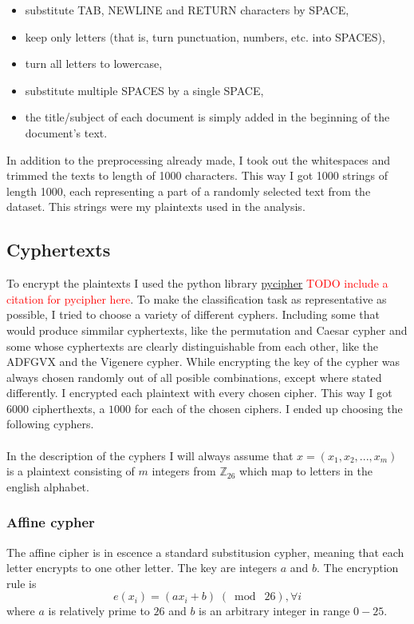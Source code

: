 \documentclass[a4paper]{article}
\begin{document}
\begin{itemize}	
	\setlength\itemsep{-0.2em}
    \item substitute TAB, NEWLINE and RETURN characters by SPACE,
    \item keep only letters (that is, turn punctuation, numbers, etc. into SPACES),
    \item turn all letters to lowercase,
    \item substitute multiple SPACES by a single SPACE,
    \item the title/subject of each document is simply added in the beginning of the document's text.
\end{itemize}


In addition to the preprocessing already made, I took out the whitespaces and trimmed the texts to length of 1000 characters. This way I got 1000 strings of length 1000, each representing a part of a randomly selected text from the dataset. This strings were my plaintexts used in the analysis.

\subsection*{Cyphertexts}
To encrypt the plaintexts I used the python library \href{https://github.com/jameslyons/pycipher}{pycipher} \textcolor{red}{TODO include a citation for pycipher here}. To make the classification task as representative as possible, I tried to choose a variety of different cyphers. Including some that would produce simmilar cyphertexts, like the permutation and Caesar cypher and some whose cyphertexts are clearly distinguishable from each other, like the ADFGVX and the Vigenere cypher. While encrypting the key of the cypher was always chosen randomly out of all posible combinations, except where stated differently. I encrypted each plaintext with every chosen cipher. This way I got $6000$ cipherthexts, a $1000$ for each of the chosen ciphers. I ended up choosing the following cyphers.\\
\\
In the description of the cyphers I will always assume that $x = (x_{1}, x_{2}, ...,x_{m})$ is a plaintext consisting of $m$ integers from $\mathbb{Z}_{26}$ which map to letters in the english alphabet.

\subsubsection*{Affine cypher}
The affine cipher is in escence a standard substitusion cypher, meaning that each letter encrypts to one other letter. The key are integers $a$ and $b$. The encryption rule is
$$e(x_{i}) = (ax_{i} + b) \;(\bmod\; 26), \forall i$$
where $a$ is relatively prime to $26$ and $b$ is an arbitrary integer in range $0-25$.
\end{document}
